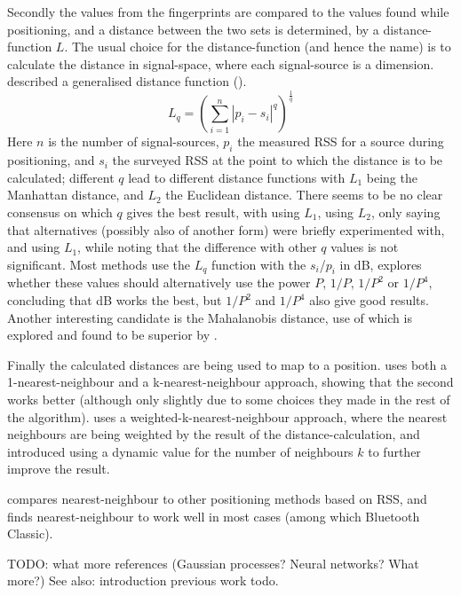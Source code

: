 Secondly the values from the fingerprints are compared to the values found while positioning, and a distance between the two sets is determined, by a distance-function $L$.
The usual choice for the distance-function (and hence the name) is to calculate the distance in signal-space, where each signal-source is a dimension.
\citet{li2005method} described a generalised distance function ().
\begin{equation}
    L_q = \left(\sum_{i=1}^{n}|p_i-s_i|^q\right)^{\frac{1}{q}}
    \label{eq:architecture-distance}
\end{equation}
Here $n$ is the number of signal-sources, $p_i$ the measured RSS for a source during positioning, and $s_i$ the surveyed RSS at the point to which the distance is to be calculated; different $q$ lead to different distance functions with $L_1$ being the Manhattan distance, and $L_2$ the Euclidean distance.
There seems to be no clear consensus on which $q$ gives the best result, with \citet{shin2012enhanced} using $L_1$, \citet{bahl2000radar} using $L_2$, only saying that alternatives (possibly also of another form) were briefly experimented with, and \citet{li2005method} using $L_1$, while noting that the difference with other $q$ values is not significant.
Most methods use the $L_q$ function with the $s_i$/$p_i$ in dB, \citet{li2005method} explores whether these values should alternatively use the power $P$, $1/P$, $1/P^2$ or $1/P^4$, concluding that dB works the best, but $1/P^2$ and $1/P^4$ also give good results.
Another interesting candidate is the Mahalanobis distance, use of which is explored and found to be superior by \citep{kaemarungsi2005efficient}.

Finally the calculated distances are being used to map to a position.
\citet{bahl2000radar} uses both a 1-nearest-neighbour and a k-nearest-neighbour approach, showing that the second works better (although only slightly due to some choices they made in the rest of the algorithm).
\citet{li2005method} uses a weighted-k-nearest-neighbour approach, where the nearest neighbours are being weighted by the result of the distance-calculation, and \citet{shin2012enhanced} introduced using a dynamic value for the number of neighbours $k$ to further improve the result.

\citet{pandya2003indoor} compares nearest-neighbour to other positioning methods based on RSS, and finds nearest-neighbour to work well in most cases (among which Bluetooth Classic).

TODO: what more references (Gaussian processes? Neural networks? What more?) See also: introduction previous work todo.

